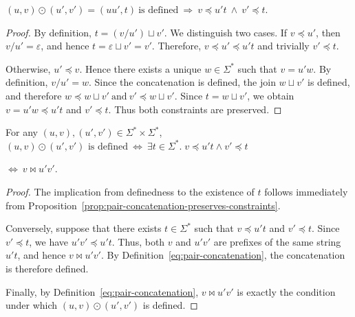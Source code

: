 \begin{proposition}
\label{prop:pair-concatenation-preserves-constraints}
$
(u,v)\odot(u',v')=(uu',t)
\ \text{is defined}
\ \Longrightarrow\
v\preceq u't
\ \land\
v'\preceq t . \label{eq:least-residual-constraint}
$
\end{proposition}

\begin{proof}
By definition, $t=(v/u')\sqcup v'.$ We distinguish two cases. If $v\preceq u'$, then $v/u'=\varepsilon$, and hence $t=\varepsilon\sqcup v'=v'.$ Therefore, $v\preceq u'\preceq u't$ and trivially $v'\preceq t.$

Otherwise, $u'\preceq v$. Hence there exists a unique $w\in\Sigma^*$ such that $v=u'w.$ By definition, $v/u'=w.$
Since the concatenation is defined, the join
$w\sqcup v'$ is defined, and therefore $
w\preceq w\sqcup v'
\:\text{and}\:
v'\preceq w\sqcup v'.$
Since $t=w\sqcup v'$, we obtain $v=u'w\preceq u't$ and $v'\preceq t.$ Thus both constraints are preserved.
\end{proof}

\begin{lemma}
\label{lem:pair-concatenation-definedness}
For any $(u,v),(u',v')\in\Sigma^*\times\Sigma^*$,
$
(u,v)\odot(u',v')\text{ is defined}
\:\Longleftrightarrow\:
\exists t\in\Sigma^*.\; v\preceq u't \land v'\preceq t
$

$
\Longleftrightarrow\:
v\bowtie u'v'.
\label{eq:pair-concatenation-definedness}
$
\end{lemma}

\begin{proof}
The implication from definedness to the existence of $t$ follows
immediately from
Proposition~\ref{prop:pair-concatenation-preserves-constraints}.

Conversely, suppose that there exists $t\in\Sigma^*$ such that
$v\preceq u't$ and $v'\preceq t$. Since $v'\preceq t$, we have
$u'v'\preceq u't$. Thus, both $v$ and $u'v'$ are prefixes of the same
string $u't$, and hence $v\bowtie u'v'$. By
Definition~\eqref{eq:pair-concatenation}, the concatenation is therefore
defined.

Finally, by Definition~\eqref{eq:pair-concatenation},
$v\bowtie u'v'$ is exactly the condition under which
$(u,v)\odot(u',v')$ is defined.
\end{proof}

